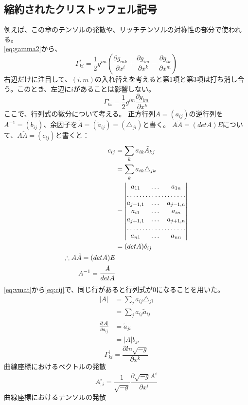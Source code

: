 \documentclass{jsarticle}
\begin{document}
\subsection{縮約されたクリストッフェル記号}
例えば、この章のテンソルの発散や、リッチテンソルの対称性の部分で使われる。\\
\eqref{eq:gamma2}から、
\begin{equation}
    \Gamma^{i}_{ki} =
    \frac{1}{2}g^{im} 
    \left(
    \frac{\partial{g_{mk}}}{\partial{x^{i}}}
     +
    \frac{\partial{g_{im}}}{\partial{x^{k}}}
     -
    \frac{\partial{g_{ik}}}{\partial{x^{m}}}
    \right)
\end{equation}
右辺だけに注目して、$(i, m)$の入れ替えを考えると第1項と第3項は打ち消し合う。このとき、左辺に$i$があることは影響しない。
\begin{equation}
    \Gamma^{i}_{ki} =
    \frac{1}{2}g^{im} 
    \frac{\partial{g_{im}}}{\partial{x^{k}}}
\end{equation}
ここで、行列式の微分について考える。
正方行列$A=(a_{ij})$の逆行列を$A^{-1}=(b_{ij})$、余因子を$\tilde{A}=(\tilde{a}_{ij})=(\triangle_{ji})$と書く。
$A\tilde{A}=(detA)E$について、$A\tilde{A} = (c_{ij})$と書くと：
\begin{align}
    c_{ij} &= \sum_{k}a_{ik}\tilde{A}_{kj}\\
           &= \sum_{k}a_{ik}\triangle_{jk}\\
           &= \begin{vmatrix}
                a_{11} & \dots & a_{1n}\\
                \hdotsfor{3}\\
                a_{j-1,1} & \dots & a_{j-1,n}\\
                a_{i1} & \dots & a_{in}\\
                a_{j+1,1} & \dots & a_{j+1,n}\\
                \hdotsfor{3}\\
                a_{n1} & \dots & a_{nn}
            \end{vmatrix}\label{eq:vmat}\\
           &= (detA)\delta_{ij}\label{eq:cij}\\
    \therefore A\tilde{A}=(detA)E\\
    A^{-1} = \frac{\tilde{A}}{detA}
\end{align}
\eqref{eq:vmat}から\eqref{eq:cij}で、同じ行があると行列式が0になることを用いた。
\begin{align}
    |A| &= \sum_{j}a_{ij}\triangle_{ji}\\
        &= \sum_{j}a_{ij}\tilde{a}_{ij}\\
    \frac{\partial{|A|}}{\partial{a_{ij}}} &= \tilde{a}_{ji}\\
                                           &= |A|b_{ji}
\end{align}
\begin{equation}
    \Gamma^{i}_{ki} =
    \frac{\partial{ln\sqrt{-g}}}{\partial{x^{k}}}
\end{equation}
曲線座標におけるベクトルの発散
\begin{equation}
    A^{i}_{;i} = 
    \frac{1}{\sqrt{-g}}\frac{\partial \sqrt{-g}A^{i}}{\partial{x^{i}}}
\end{equation}
曲線座標におけるテンソルの発散
\end{document}
